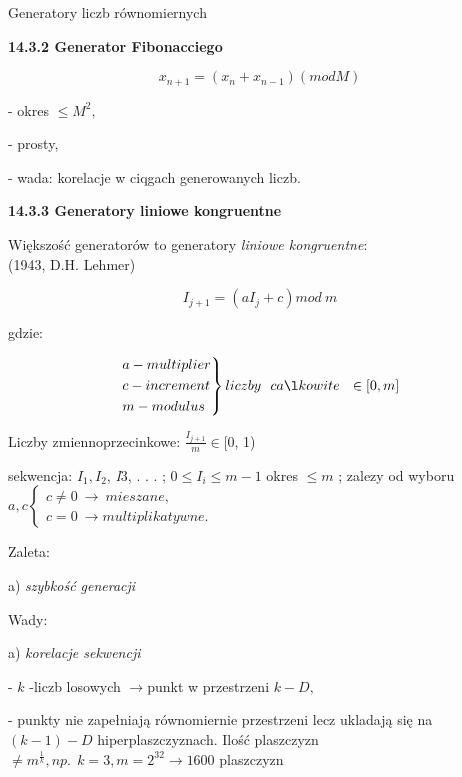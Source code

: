     \begin{frame}{Generatory liczb równomiernych}

	\textbf{14.3.2 Generator Fibonacciego}
	\begin{center}
 	$$x_{n+1} = (x_{n} + x_{n-1})(mod M)$$
	\end{center}
	- okres $\leq M^{2},$

	- prosty,

	- wada: korelacje w ciqgach generowanych liczb.
    \newline
	\end{frame}
    \begin{frame}
	\textbf{14.3.3 Generatory liniowe kongruentne}

	Większość generatorów to generatory {\it liniowe kongruentne}:\\ (1943, D.H. Lehmer)
	\begin{center}
 	$$I_{j+1} = (aI_{j}+c) mod\ m$$
	\end{center}
	gdzie:

    \[
    {\begin{rcases*}
	a - multiplier\\
	c - increment\\
	m - modulus
    \end{rcases*} liczby\ \ całkowite \ \ \in [0,m]}
    \]
	\end{frame}
    \begin{frame}
	Liczby zmiennoprzecinkowe: $\displaystyle \frac{I_{j+1}}{m}\in[0$, 1)
    \newline

	sekwencja: $I_{1}, I_{2}$, {\it I}3, . . . ; $0\leq I_{i}\leq m-1$
    \newline \newline
    okres $\leq m$ ; zalezy od wyboru $a, c \left\{\begin{array}{l}
	c\neq 0\ \rightarrow\ mieszane,\\
	c=0\ \rightarrow multiplikatywne.
	\end{array}\right.$

	Zaleta:

	a) {\it szybkość generacji}
	\newline

	Wady:

	a) {\it korelacje sekwencji}

	- $k$ -liczb losowych $\rightarrow$punkt w przestrzeni $k-D,$

	- punkty nie zapełniają r\'{o}wnomiernie przestrzeni lecz ukladają się na $(k-1)-D$ 				hiperplaszczyznach. Ilość plaszczyzn $\neq m^{\frac{1}{k}}, np. \ \ k=3, m=2^{32}\rightarrow 1600$ 		plaszczyzn

    \end{frame}
